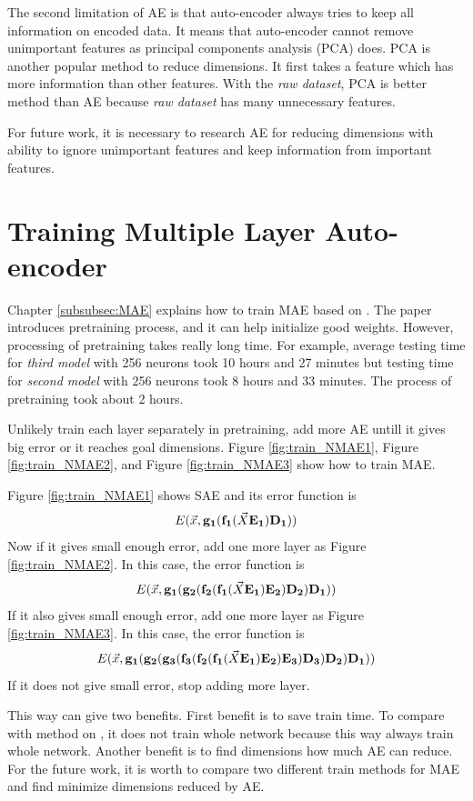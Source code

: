 \documentclass[draft,dvipsnames]{drexel-thesis}
\begin{document}
\begin{thesis}
The second limitation of AE is that auto-encoder always tries to keep all information on encoded data. It means that auto-encoder cannot remove unimportant features as principal components analysis (PCA) does. PCA is another popular method to reduce dimensions. It first takes a feature which has more information than other features. With the {\em raw dataset}, PCA is better method than AE because {\em raw dataset} has many unnecessary features.

For future work, it is necessary to research AE for reducing dimensions with ability to ignore unimportant features and keep information from important features.

\section{Training Multiple Layer Auto-encoder}
Chapter \ref{subsubsec:MAE} explains how to train MAE based on \cite{hinton2006reducing}. The paper introduces pretraining process, and it can help initialize good weights. However, processing of pretraining takes really long time. For example, average testing time for {\em third model} with 256 neurons took 10 hours and 27 minutes but testing time for {\em second model} with 256 neurons took 8 hours and 33 minutes. The process of pretraining took about 2 hours.

Unlikely train each layer separately in pretraining, add more AE untill it gives big error or it reaches goal dimensions. Figure \ref{fig:train_NMAE1}, Figure \ref{fig:train_NMAE2}, and Figure \ref{fig:train_NMAE3} show how to train MAE.

	Figure \ref{fig:train_NMAE1} shows SAE and its error function is
$$E(\vec{x}, \bold{g_1}(\bold{f_1}(\vec{X}\bold{E_1})\bold{D_1}))$$
Now if it gives small enough error, add one more layer as Figure \ref{fig:train_NMAE2}. In this case, the error function is
$$E(\vec{x}, \bold{g_1}(\bold{g_2}(\bold{f_2}(\bold{f_1}(\vec{X}\bold{E_1})\bold{E_2})\bold{D_2})\bold{D_1}))$$
If it also gives small enough error, add one more layer as Figure \ref{fig:train_NMAE3}. In this case, the error function is
$$E(\vec{x}, \bold{g_1}(\bold{g_2}(\bold{g_3}(\bold{f_3}(\bold{f_2}(\bold{f_1}(\vec{X}\bold{E_1})\bold{E_2})\bold{E_3})\bold{D_3})\bold{D_2})\bold{D_1}))$$
If it does not give small error, stop adding more layer.

This way can give two benefits. First benefit is to save train time. To compare with method on \cite{hinton2006reducing}, it does not train whole network because this way always train whole network. Another benefit is to find dimensions how much AE can reduce. For the future work, it is worth to compare two different train methods for MAE and find minimize dimensions reduced by AE.


\end{thesis}
\end{document}
